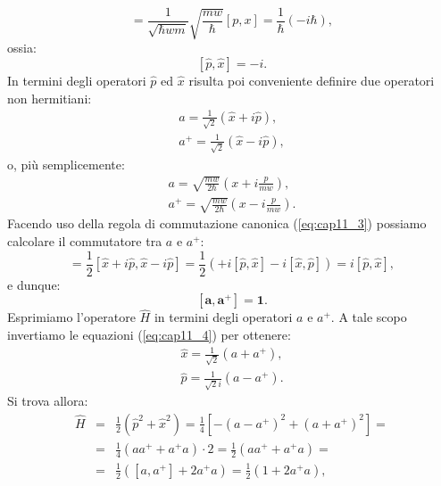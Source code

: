 \begin{equation}
[\hat{p},\hat{x}]= \frac{1}{\sqrt{\hbar w m}} \sqrt{\frac{mw}{\hbar}} [p,x]=\frac{1}{\hbar}(-i\hbar),
\end{equation}
ossia:
\begin{equation}  \label{eq:cap11_3}
[\hat{p},\hat{x}]=-i.
\end{equation}
In termini degli operatori $\hat{p}$ ed $\hat{x}$ risulta poi conveniente definire due operatori non hermitiani:
\begin{equation} \label{eq:cap11_4}
\begin{split} 
	a=\frac{1}{\sqrt{2} } (\hat{x}+i\hat{p}), \\
	a^+=\frac{1}{\sqrt{2} } (\hat{x}-i\hat{p}),
\end{split} \end{equation}
o, più semplicemente:
\begin{equation} 
\begin{split}
	a=\sqrt{\frac{mw}{2\hbar}}(x+i \frac{p}{mw}), \\
	a^+=\sqrt{\frac{mw}{2\hbar}}(x-i \frac{p}{mw}).
\end{split}
\end{equation}
Facendo uso della regola di commutazione canonica (\ref{eq:cap11_3}) possiamo calcolare il commutatore tra $a$ e $a^+$:
\begin{equation}
[a,a^+]=\frac{1}{2} [\hat{x}+i\hat{p},\hat{x}-i\hat{p}]=\frac{1}{2}  \left( +i[\hat{p},\hat{x}]-i[\hat{x},\hat{p}]   \right ) = i[\hat{p},\hat{x}],
\end{equation}
e dunque:
\begin{equation}
\mathbf{[a,a^+]=1}.
\end{equation}
Esprimiamo l'operatore $\hat{H}$ in termini degli operatori $a$ e $a^+$. A tale scopo invertiamo le equazioni (\ref{eq:cap11_4}) per ottenere:
\begin{equation} \label{eq:cap11_5}
\begin{split} 
	\hat{x}=\frac{1}{\sqrt{2} } (a+a^+), \\
	\hat{p}=\frac{1}{\sqrt{2}i } (a-a^+).
\end{split}
\end{equation}
Si trova allora:
\begin{eqnarray}
	\hat{H} &=& \frac{1}{2} (\hat{p}^2+\hat{x}^2)=  \frac{1}{4} \left[ -(a-a^+)^2+(a+a^+)^2  \right]= \nonumber\\
	&= &\frac{1}{4} (aa^++a^+a)\cdot 2= \frac{1}{2}(aa^++a^+a)= \nonumber\\
	&=&\frac{1}{2}( [a,a^+]+2a^+a  )=\frac{1}{2}(1+2a^+a ),
\end{eqnarray}
